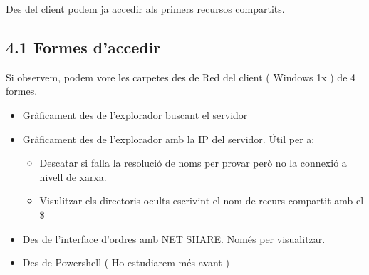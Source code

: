 \documentclass[
  a4paper,
]{article}
\providecommand{\tightlist}{%
  \setlength{\itemsep}{0pt}\setlength{\parskip}{0pt}}
\begin{document}
Des del client podem ja accedir als primers recursos compartits.

\subsection{4.1 Formes d'accedir}\label{formes-daccedir}

Si observem, podem vore les carpetes des de Red del client ( Windows 1x
) de 4 formes.

\begin{itemize}
\tightlist
\item
  Gràficament des de l'explorador buscant el servidor
\item
  Gràficament des de l'explorador amb la IP del servidor. Útil per a:

  \begin{itemize}
  \tightlist
  \item
    Descatar si falla la resolució de noms per provar però no la
    connexió a nivell de xarxa.
  \item
    Visulitzar els directoris ocults escrivint el nom de recurs
    compartit amb el \$
  \end{itemize}
\item
  Des de l'interface d'ordres amb NET SHARE. Només per visualitzar.
\item
  Des de Powershell ( Ho estudiarem més avant )
\end{itemize}
\end{document}
